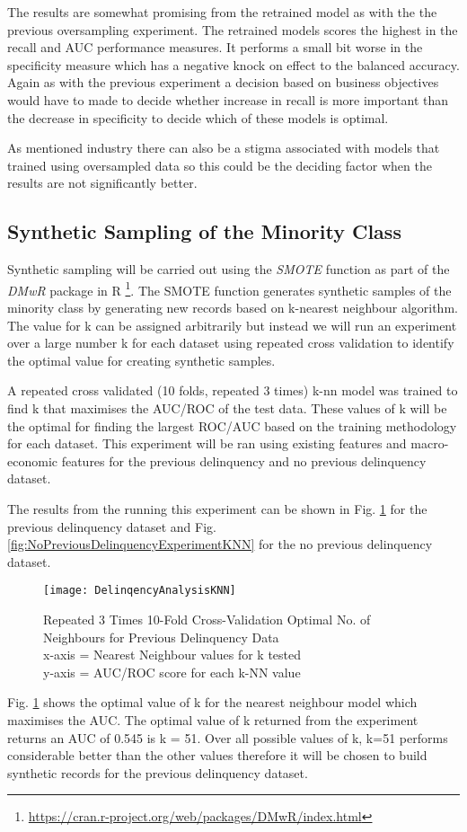 The results are somewhat promising from the retrained model as with the the previous oversampling experiment. The retrained models scores the highest in the recall and AUC performance measures. It performs a small bit worse in the specificity measure which has a negative knock on effect to the balanced accuracy. Again as with the previous experiment a decision based on business objectives would have to made to decide whether increase in recall is more important than the decrease in specificity to decide which of these models is optimal. 

As mentioned industry there can also be a stigma associated with models that trained using oversampled data so this could be the deciding factor when the results are not significantly better.


\subsection{Synthetic Sampling of the Minority Class}
Synthetic sampling will be carried out using the \textit{SMOTE} function as part of the \textit{DMwR} package in R \footnote{\url{https://cran.r-project.org/web/packages/DMwR/index.html}}. The SMOTE function generates synthetic samples of the minority class  by generating new records based on k-nearest neighbour algorithm. The value for k can be assigned arbitrarily but instead we will run an experiment over a large number k for each dataset using repeated cross validation to identify the optimal value for creating synthetic samples.

A repeated cross validated (10 folds, repeated 3 times) k-nn model was trained to find k that maximises the AUC/ROC of the test data. These values of k will be the optimal for finding the largest ROC/AUC based on the training methodology for each dataset. This experiment will be ran using existing features and macro-economic features for the previous delinquency and no previous delinquency dataset. 

The results from the running this experiment can be shown in Fig. \ref{fig:DelinqencyAnalysisKNN} for the previous delinquency dataset and Fig. \ref{fig:NoPreviousDelinquencyExperimentKNN} for the no previous delinquency dataset.

\begin{figure}[H]
	\texttt{[image: DelinqencyAnalysisKNN]}
	\caption{Repeated 3 Times 10-Fold Cross-Validation Optimal No. of \\Neighbours for Previous Delinquency Data\\
		x-axis = Nearest Neighbour values for k tested\\
		y-axis = AUC/ROC score for each k-NN value}
	\label{fig:DelinqencyAnalysisKNN}
\end{figure} 
Fig. \ref{fig:DelinqencyAnalysisKNN} shows the optimal value of k for the nearest neighbour model which maximises the AUC. The optimal value of k returned from the experiment returns an AUC of 0.545 is k = 51. Over all possible values of k, k=51 performs considerable better than the other values therefore it will be chosen to build synthetic records for the previous delinquency dataset.

